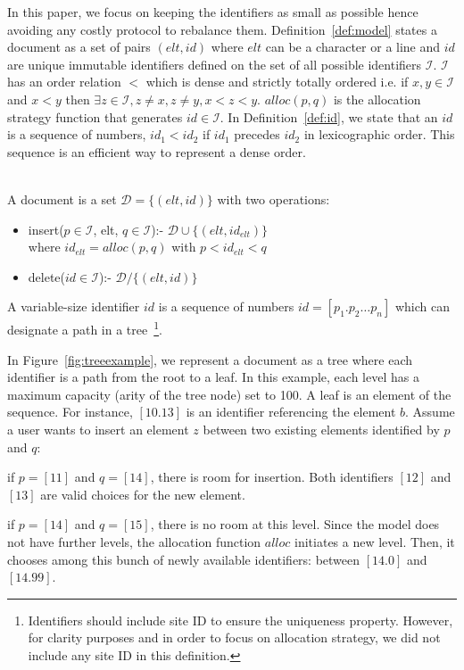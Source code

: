In this paper, we focus on keeping the identifiers as small as possible hence
avoiding any costly protocol to rebalance them. Definition~\ref{def:model}
states a document as a set of pairs $(elt, id)$ where $elt$ can be a character
or a line and $id$ are unique immutable identifiers defined on the set of all
possible identifiers $\mathcal{I}$. $\mathcal{I}$ has an order relation $<$
which is dense and strictly totally ordered i.e. if $x,y \in \mathcal{I}$ and
$x < y$ then $\exists z \in \mathcal{I}, z\neq x, z\neq y, x < z <
y$. $alloc(p,q)$ is the allocation strategy function that generates $id \in
\mathcal{I}$. In Definition~\ref{def:id}, we state that an $id$ is a sequence
of numbers, $id_1<id_2$ if $id_1 $ precedes $id_2$ in lexicographic order. This
sequence is an efficient way to represent a dense order.

\begin{Def}\ \\
A document is a set $\mathcal{D} = \{ (elt, id) \}$ with two operations:
\begin{itemize}
  \item insert($p \in \mathcal{I}$, elt, $q \in
    \mathcal{I}$):- $\mathcal{D} \cup \{(elt,id_{elt})\}$ \\ where
    $id_{elt}=alloc(p,q)$ with $p<id_{elt}<q$
  \item delete($id \in \mathcal{I}$):- $\mathcal{D}/\{(elt,id)\}$
\end{itemize}
\label{def:model}
\end{Def}

\begin{Def}
  A variable-size identifier $id$ is a sequence of numbers $id=[p_1.p_2\ldots
    p_n]$ which can designate a path in a tree~\footnote{Identifiers should
    include site ID to ensure the uniqueness property. However, for clarity
    purposes and in order to focus on allocation strategy, we did not
    include any site ID in this definition.}.
\label{def:id}
\end{Def}

In Figure~\ref{fig:treeexample}, we represent a document as a tree where each
identifier is a path from the root to a leaf. In this example, each level has a
maximum capacity (arity of the tree node) set to 100. A leaf is an element of
the sequence. For instance, $[10.13]$ is an identifier referencing the element
$b$.  Assume a user wants to insert an element $z$ between two existing
elements identified by $p$ and $q$:
\begin{asparaitem}
\item if $p=[11]$ and $q=[14]$, there is room for insertion. Both identifiers
  $[12]$ and $[13]$ are valid choices for the new element.
\item if $p=[14]$ and $q=[15]$, there is no room at this level. Since the model
  does not have further levels, the allocation function $alloc$ initiates a new
  level. Then, it chooses among this bunch of newly available identifiers:
  between $[14.0]$ and $[14.99]$.
\end{asparaitem}

